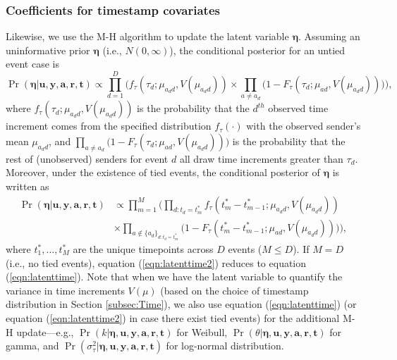 \documentclass[ba]{imsart}
\numberwithin{equation}{section}
\theoremstyle{plain}
\begin{document}
	\subsubsection{Coefficients for timestamp covariates}
	Likewise, we use the M-H algorithm to update the latent variable $\boldsymbol{\eta}$. Assuming an uninformative prior $\boldsymbol{\eta}$ (i.e., $N({0},\infty)$), the conditional posterior for an untied event case is
	\begin{equation}
		\Pr(\boldsymbol{\eta}| \boldsymbol{u}, \boldsymbol{y},\boldsymbol{a}, \boldsymbol{r},\boldsymbol{t})\propto \prod_{d=1}^D\Big(f_{\tau}(\tau_{d}; \mu_{a_d d}, V(\mu_{a_d d}))\times \prod_{a\neq a_d}\big(1-F_{\tau}(\tau_{d}; \mu_{a d}, V(\mu_{a_d d})) \big)\Big),
		\label{eqn:latenttime}
	\end{equation}
	where $f_{\tau}(\tau_{d}; \mu_{a_d d}, V(\mu_{a_d d}))$ is the probability that the $d^{th}$ observed time increment comes from the specified distribution $f_\tau(\cdot)$ with the observed sender's mean $\mu_{a_d d}$, and $\prod_{a\neq a_d}\big(1-F_{\tau}(\tau_{d}; \mu_{a d},V(\mu_{a_d d})) \big)$ is the probability that the rest of (unobserved) senders for event $d$ all draw time increments greater than $\tau_d$. Moreover, under the existence of tied events, the conditional posterior of $\boldsymbol{\eta}$ is written as
	\begin{equation}
		\begin{aligned}
			\Pr(\boldsymbol{\eta}| \boldsymbol{u}, \boldsymbol{y},\boldsymbol{a}, \boldsymbol{r},\boldsymbol{t})&\propto \prod_{m=1}^M\Big(\prod_{d:t_d=t_m^*}f_{\tau}(t_m^*-t_{m-1}^*; \mu_{a_d d}, V(\mu_{a_d d})) \\&\times \prod_{a \notin \{a_d\}_{d:t_d=t_m^*}}\big(1-F_{\tau}(t_m^*-t_{m-1}^*; \mu_{a d}, V(\mu_{a_d d})) \big)\Big),
		\end{aligned}
		\label{eqn:latenttime2}
	\end{equation}
	where $t_1^*,\ldots,t_M^*$ are the unique timepoints across $D$ events ($M \leq D$). If $M=D$ (i.e., no tied events), equation (\ref{eqn:latenttime2}) reduces to equation (\ref{eqn:latenttime}). Note that when we have the latent variable to quantify the variance in time increments $V(\mu)$ (based on the choice of timestamp distribution in Section \ref{subsec:Time}), we also use equation (\ref{eqn:latenttime}) (or equation (\ref{eqn:latenttime2}) in case there exist tied events) for the additional M-H update---e.g., $\Pr(k| \boldsymbol{\eta},\boldsymbol{u}, \boldsymbol{y},\boldsymbol{a}, \boldsymbol{r},\boldsymbol{t})$ for Weibull, $\Pr(\theta| \boldsymbol{\eta},\boldsymbol{u}, \boldsymbol{y},\boldsymbol{a}, \boldsymbol{r},\boldsymbol{t})$ for gamma, and  $\Pr(\sigma^2_\tau| \boldsymbol{\eta},\boldsymbol{u}, \boldsymbol{y},\boldsymbol{a}, \boldsymbol{r},\boldsymbol{t})$ for log-normal distribution.
\end{document}
